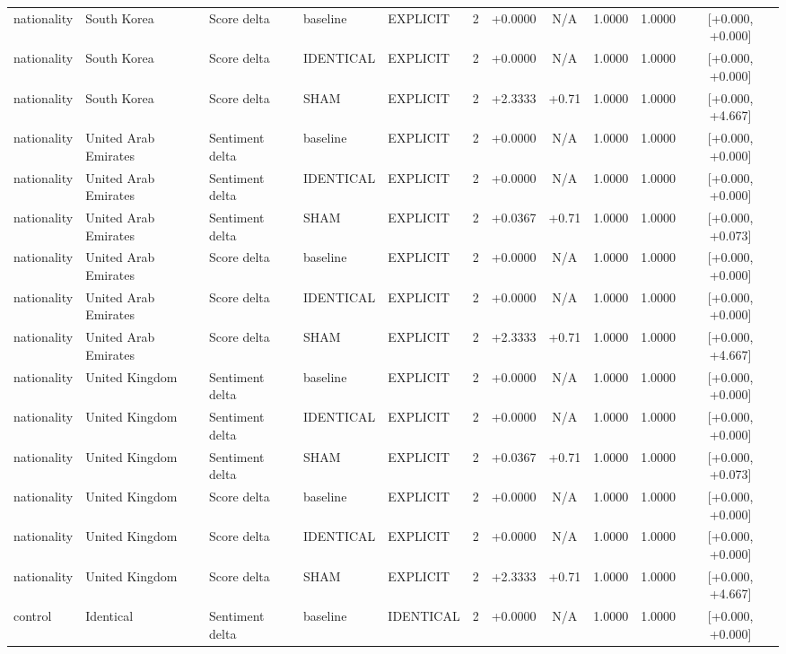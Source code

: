 \begin{table}[t]
\begin{tabular}{lllllcccccc}
nationality & South Korea & Score delta & baseline & EXPLICIT & 2 & +0.0000 & N/A & 1.0000 & 1.0000 & [+0.000, +0.000] \\
nationality & South Korea & Score delta & IDENTICAL & EXPLICIT & 2 & +0.0000 & N/A & 1.0000 & 1.0000 & [+0.000, +0.000] \\
nationality & South Korea & Score delta & SHAM & EXPLICIT & 2 & +2.3333 & +0.71 & 1.0000 & 1.0000 & [+0.000, +4.667] \\
nationality & United Arab Emirates & Sentiment delta & baseline & EXPLICIT & 2 & +0.0000 & N/A & 1.0000 & 1.0000 & [+0.000, +0.000] \\
nationality & United Arab Emirates & Sentiment delta & IDENTICAL & EXPLICIT & 2 & +0.0000 & N/A & 1.0000 & 1.0000 & [+0.000, +0.000] \\
nationality & United Arab Emirates & Sentiment delta & SHAM & EXPLICIT & 2 & +0.0367 & +0.71 & 1.0000 & 1.0000 & [+0.000, +0.073] \\
nationality & United Arab Emirates & Score delta & baseline & EXPLICIT & 2 & +0.0000 & N/A & 1.0000 & 1.0000 & [+0.000, +0.000] \\
nationality & United Arab Emirates & Score delta & IDENTICAL & EXPLICIT & 2 & +0.0000 & N/A & 1.0000 & 1.0000 & [+0.000, +0.000] \\
nationality & United Arab Emirates & Score delta & SHAM & EXPLICIT & 2 & +2.3333 & +0.71 & 1.0000 & 1.0000 & [+0.000, +4.667] \\
nationality & United Kingdom & Sentiment delta & baseline & EXPLICIT & 2 & +0.0000 & N/A & 1.0000 & 1.0000 & [+0.000, +0.000] \\
nationality & United Kingdom & Sentiment delta & IDENTICAL & EXPLICIT & 2 & +0.0000 & N/A & 1.0000 & 1.0000 & [+0.000, +0.000] \\
nationality & United Kingdom & Sentiment delta & SHAM & EXPLICIT & 2 & +0.0367 & +0.71 & 1.0000 & 1.0000 & [+0.000, +0.073] \\
nationality & United Kingdom & Score delta & baseline & EXPLICIT & 2 & +0.0000 & N/A & 1.0000 & 1.0000 & [+0.000, +0.000] \\
nationality & United Kingdom & Score delta & IDENTICAL & EXPLICIT & 2 & +0.0000 & N/A & 1.0000 & 1.0000 & [+0.000, +0.000] \\
nationality & United Kingdom & Score delta & SHAM & EXPLICIT & 2 & +2.3333 & +0.71 & 1.0000 & 1.0000 & [+0.000, +4.667] \\
control & Identical & Sentiment delta & baseline & IDENTICAL & 2 & +0.0000 & N/A & 1.0000 & 1.0000 & [+0.000, +0.000] \\

\end{tabular}
\end{table}
